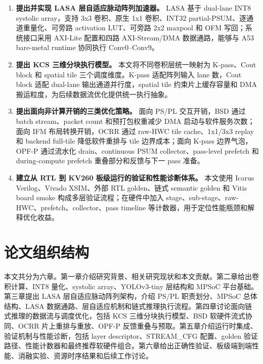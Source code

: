 \begin{enumerate}
    \item \textbf{提出并实现 LASA 层自适应脉动阵列加速器。} LASA 基于 dual-lane INT8 systolic array，支持 3x3 卷积、原生 1x1 卷积、INT32 partial-PSUM、逐通道重量化、可旁路 activation LUT、可旁路 2x2 maxpool 和 OFM 写回；系统接口采用 AXI-Lite 配置和四路 AXI-Stream/DMA 数据通路，能够与 A53 bare-metal runtime 协同执行 Conv0--Conv9。

    \item \textbf{提出 KCS 三维分块执行模型。} 本文将不同卷积层统一映射为 K-pass、Cout block 和 spatial tile 三个调度维度。K-pass 适配阵列输入 lane 数，Cout block 适配 dual-lane 输出通道并行度，spatial tile 约束片上缓存容量和 DMA 搬运粒度，为后续数据流优化提供统一执行抽象。

    \item \textbf{提出面向非计算开销的三类优化策略。} 面向 PS/PL 交互开销，BSD 通过 batch stream、packet count 和预打包权重减少 DMA 启动与软件服务次数；面向 IFM 布局转换开销，OCRR 通过 raw-HWC tile cache、1x1/3x3 replay 和 backend full-tile 降低软件重排与 tile 边界成本；面向 K-pass 边界气泡，OPF-P 通过流水化 drain、continuous PSUM collector、pass-level prefetch 和 during-compute prefetch 重叠部分和反馈与下一 pass 准备。

    \item \textbf{建立从 RTL 到 KV260 板级运行的验证和性能诊断体系。} 本文使用 Icarus Verilog、Vivado XSIM、外部 RTL golden、链式 semantic golden 和 Vitis board smoke 构成多层验证流程；在硬件中加入 stage、sub-stage、raw-HWC、prefetch、collector、pass timeline 等计数器，用于定位性能瓶颈和解释优化收益。
\end{enumerate}

\section{论文组织结构}

本文共分为六章。第一章介绍研究背景、相关研究现状和本文贡献。第二章给出卷积计算、INT8 量化、systolic array、YOLOv3-tiny 层结构和 MPSoC 平台基础。第三章提出 LASA 层自适应脉动阵列架构，介绍 PS/PL 职责划分、MPSoC 总体结构、LASA 数据通路、层自适应机制和链式推理执行流程。第四章讨论面向链式推理的数据流与调度优化，包括 KCS 三维分块执行模型、BSD 软硬件流式协同、OCRR 片上重排与重放、OPF-P 反馈重叠与预取。第五章介绍运行时集成、验证机制与性能诊断，包括 layer descriptor、STREAM\_CFG 配置、golden 验证路径、性能计数器和最终推荐软硬件组合。第六章给出正确性验证、板级端到端性能、消融实验、资源时序结果和后续工作讨论。
